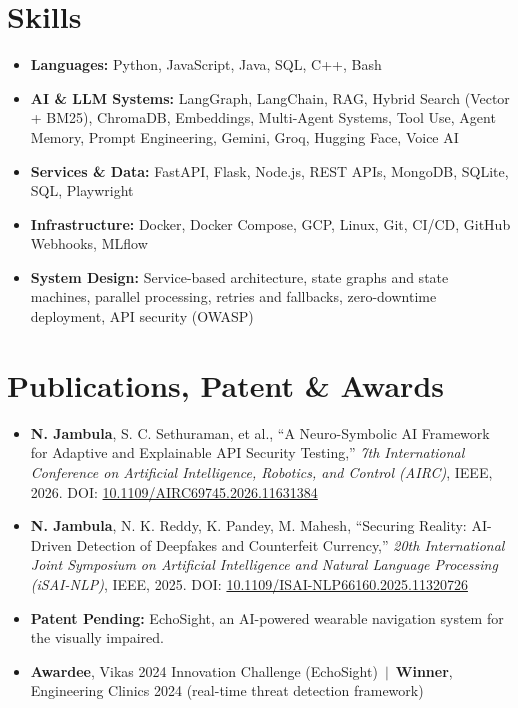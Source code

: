 \documentclass[a4paper,10pt]{article}
\begin{document}
\section{Skills}
\begin{itemize}
  \item \textbf{Languages:} Python, JavaScript, Java, SQL, C++, Bash
  \item \textbf{AI \& LLM Systems:} LangGraph, LangChain, RAG, Hybrid Search (Vector + BM25), ChromaDB, Embeddings, Multi-Agent Systems, Tool Use, Agent Memory, Prompt Engineering, Gemini, Groq, Hugging Face, Voice AI
  \item \textbf{Services \& Data:} FastAPI, Flask, Node.js, REST APIs, MongoDB, SQLite, SQL, Playwright
  \item \textbf{Infrastructure:} Docker, Docker Compose, GCP, Linux, Git, CI/CD, GitHub Webhooks, MLflow
  \item \textbf{System Design:} Service-based architecture, state graphs and state machines, parallel processing, retries and fallbacks, zero-downtime deployment, API security (OWASP)
\end{itemize}

\section{Publications, Patent \& Awards}
\begin{itemize}
  \item \textbf{N. Jambula}, S. C. Sethuraman, et al., ``A Neuro-Symbolic AI Framework for Adaptive and Explainable API Security Testing,'' \textit{7th International Conference on Artificial Intelligence, Robotics, and Control (AIRC)}, IEEE, 2026.
        DOI: \href{https://doi.org/10.1109/AIRC69745.2026.11631384}{10.1109/AIRC69745.2026.11631384}
  \item \textbf{N. Jambula}, N. K. Reddy, K. Pandey, M. Mahesh, ``Securing Reality: AI-Driven Detection of Deepfakes and Counterfeit Currency,'' \textit{20th International Joint Symposium on Artificial Intelligence and Natural Language Processing (iSAI-NLP)}, IEEE, 2025.
        DOI: \href{https://doi.org/10.1109/ISAI-NLP66160.2025.11320726}{10.1109/ISAI-NLP66160.2025.11320726}
  \item \textbf{Patent Pending:} EchoSight, an AI-powered wearable navigation system for the visually impaired.
  \item \textbf{Awardee}, Vikas 2024 Innovation Challenge (EchoSight) \,$|$\, \textbf{Winner}, Engineering Clinics 2024 (real-time threat detection framework)
\end{itemize}
\end{document}
